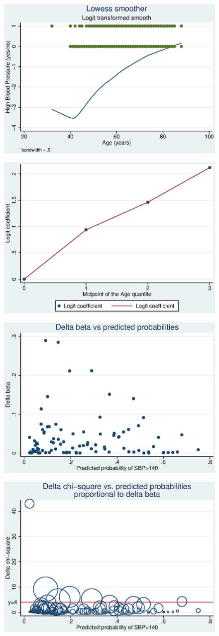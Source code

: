 \documentclass{article}
\begin{document}
\begin{enumerate}
\begin{figure}
\includegraphics[width=.7\linewidth]{part2_hibp_vs_age_lowess.eps}
\end{figure}
\begin{figure}
\includegraphics[width=.7\linewidth]{part2_hibp_vs_age_quant.eps}
\end{figure}
\begin{figure}
\includegraphics[width=.7\linewidth]{part4_Deltabeta_p_.eps}
\end{figure}
\begin{figure}
\includegraphics[width=.7\linewidth]{part4_Deltachisq_p_beta_.eps}

\end{figure}
\end{enumerate}
\end{document}
